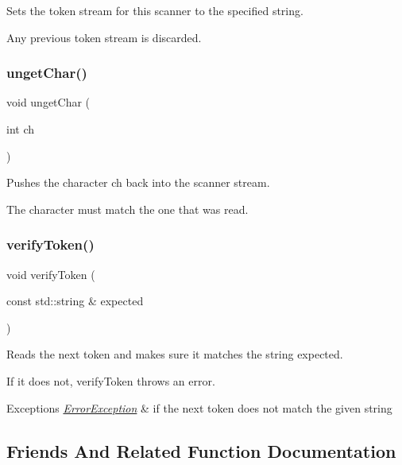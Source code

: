 Sets the token stream for this scanner to the specified string. 

Any previous token stream is discarded. \mbox{\label{classTokenScanner_a44b49340cfed6b94e9f625c9f2f73fbf}} 
\subsubsection{\texorpdfstring{unget\+Char()}{ungetChar()}}
{\footnotesize\ttfamily void unget\+Char (\begin{DoxyParamCaption}\item[{int}]{ch }\end{DoxyParamCaption})}



Pushes the character {\ttfamily ch} back into the scanner stream. 

The character must match the one that was read. \mbox{\label{classTokenScanner_ad7ae526d42faff3aca1c860f302cbb76}} 
\subsubsection{\texorpdfstring{verify\+Token()}{verifyToken()}}
{\footnotesize\ttfamily void verify\+Token (\begin{DoxyParamCaption}\item[{const std\+::string \&}]{expected }\end{DoxyParamCaption})}



Reads the next token and makes sure it matches the string {\ttfamily expected}. 

If it does not, {\ttfamily verify\+Token} throws an error. 
\begin{DoxyExceptions}{Exceptions}
{\em \mbox{\hyperlink{classErrorException}{Error\+Exception}}} & if the next token does not match the given string \\
\hline
\end{DoxyExceptions}


\subsection{Friends And Related Function Documentation}
\mbox{\label{classTokenScanner_a23b7e3f2cb864430084bde0951947124}} 
